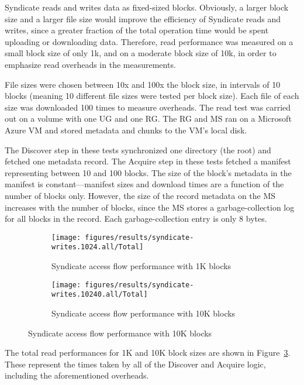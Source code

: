 Syndicate reads and writes data as fixed-sized blocks.  Obviously, a larger
block size and a larger file size would improve the efficiency of Syndicate
reads and writes, since a greater fraction of the total operation time would be
spent uploading or downloading data.  Therefore, read performance was measured
on a small block size of only 1k, and on a moderate block size of 10k, in order
to emphasize read overheads in the measurements.

File sizes were chosen between 10x and 100x the block size, in intervals of 10
blocks (meaning 10 different file sizes were tested per block size).  Each file
of each size was downloaded 100 times to measure overheads.
The read test was carried out on a volume with one UG and one RG.
The RG and MS ran on a Microsoft
Azure VM and stored metadata and chunks to the VM's local disk.

The Discover step in these tests synchronized one directory (the root) and fetched
one metadata record.  The Acquire step in these tests fetched a manifest representing between 10 and
100 blocks.  The size of the block's metadata in the manifest is
constant---manifest sizes and download times are a function of the number of
blocks only.  However, the size of the record metadata on the MS increases with
the number of blocks, since the MS stores a garbage-collection log for all
blocks in the record.  Each garbage-collection entry is only 8 bytes.


\begin{figure}[htp!]
   \centering
   \caption{Box-and-whiskers plots of end-to-end access flow performances in
   Syndicate, for 1K and 10K block sizes.}
   \begin{subfigure}[b]{.8\textwidth}
      \texttt{[image: figures/results/syndicate-writes.1024.all/Total]}
      \label{fig:syndicate-read-total-1k}
      \caption{Syndicate access flow performance with 1K blocks}
   \end{subfigure}
   \begin{subfigure}[b]{.8\textwidth}
      \texttt{[image: figures/results/syndicate-writes.10240.all/Total]}
      \label{fig:syndicate-read-total-1k}
      \caption{Syndicate access flow performance with 10K blocks}
   \end{subfigure}
   \label{fig:syndicate-read-total}
\end{figure}

The total read performances for 1K and 10K block sizes are shown in
Figure~\ref{fig:syndicate-read-total}.  These represent the times taken by all
of the Discover and Acquire logic, including the aforementioned overheads.

